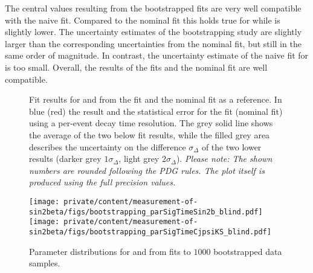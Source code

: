 The central values resulting from the bootstrapped \sPlot fits are very well
compatible with the naive \sPlot fit. Compared to the nominal fit this holds
true for \CJpsiKS while \SJpsiKS is slightly lower. The uncertainty estimates of
the bootstrapping study are slightly larger than the corresponding uncertainties
from the nominal fit, but still in the same order of magnitude. In contrast, the
uncertainty estimate of the naive \sPlot fit for \SJpsiKS is too small. Overall,
the results of the \sPlot fits and the nominal fit are well compatible.
%
\begin{figure}
\centering


\caption{
Fit results for \SJpsiKS and \CJpsiKS from the \sPlot fit and the nominal fit as
a reference. In blue (red) the result and the statistical error for the \sPlot
fit (nominal fit) using a per-event decay time resolution. The grey solid line
shows the average of the two below fit results, while the filled grey area
describes the uncertainty on the difference $\sigma_\Delta$ of the two lower
results (darker grey $1\sigma_\Delta$, light grey $2\sigma_\Delta$).
\textit{Please note: The shown numbers are rounded following the PDG rules. The
plot itself is produced using the full precision values.}}
\label{fig:measurement_of_sin2beta:systematics:cross_checks:splot_fit:s_and_c}
\end{figure}
%
\begin{figure}
\centering
\texttt{[image: private/content/measurement-of-sin2beta/figs/bootstrapping\_parSigTimeSin2b\_blind.pdf]}
\hfill
\texttt{[image: private/content/measurement-of-sin2beta/figs/bootstrapping\_parSigTimeCjpsiKS\_blind.pdf]}
\caption{
Parameter distributions for \SJpsiKS and \CJpsiKS from \sPlot fits to
$\num{1000}$ bootstrapped data samples.}
\label{fig:measurement_of_sin2beta:systematics:cross_checks:splot_fit:bootstrapping}
\end{figure}

